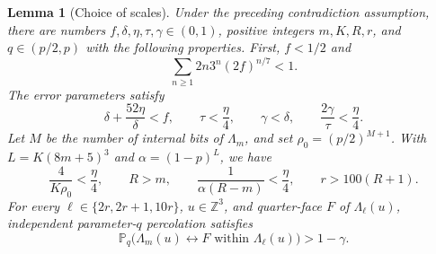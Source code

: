 \documentclass[11pt]{article}
\newtheorem{lemma}[theorem]{Lemma}
\theoremstyle{definition}
\theoremstyle{remark}
\numberwithin{equation}{section}
\begin{document}
\begin{lemma}[Choice of scales]\label{prelim:scales}
Under the preceding contradiction assumption, there are numbers
$f,\delta,\eta,\tau,\gamma\in(0,1)$, positive integers $m,K,R,r$, and
$q\in(p/2,p)$ with the following properties. First, $f<1/2$ and
\begin{equation}\label{prelim:contour-budget}
 \sum_{n\ge1}2n3^n(2f)^{n/7}<1.
\end{equation}
The error parameters satisfy
\begin{equation}\label{prelim:budgets}
 \delta+\frac{52\eta}{\delta}<f,\qquad
 \tau<\frac\eta4,\qquad \gamma<\delta,\qquad
 \frac{2\gamma}{\tau}<\frac\eta4.
\end{equation}
Let $M$ be the number of internal bits of $\Lambda_m$, and set
$\rho_0=(p/2)^{M+1}$. With $L=K(8m+5)^3$ and $\alpha=(1-p)^L$, we have
\begin{equation}\label{prelim:scale-inequalities}
 \frac4{K\rho_0}<\frac\eta4,\qquad
 R>m,\qquad \frac1{\alpha(R-m)}<\frac\eta4,\qquad r>100(R+1).
\end{equation}
For every $\ell\in\{2r,2r+1,10r\}$, $u\in\mathbb Z^3$, and quarter-face
$F$ of $\Lambda_\ell(u)$, independent parameter-$q$ percolation satisfies
\begin{equation}\label{prelim:quarterface}
 \mathbb P_q\bigl(\Lambda_m(u)\leftrightarrow F
              \text{ within }\Lambda_\ell(u)\bigr)>1-\gamma.
\end{equation}
\end{lemma}
\end{document}
